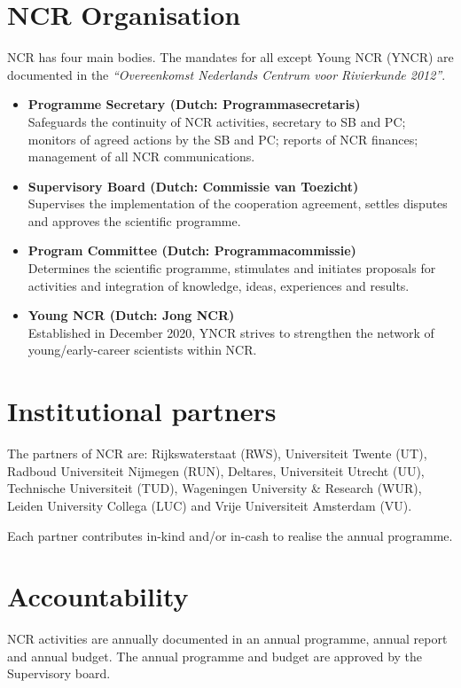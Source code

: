 \begin{multicols}{2}
\section{NCR Organisation}

NCR has four main bodies. The mandates for all except Young NCR (YNCR) are documented in the \emph{“Overeenkomst Nederlands Centrum voor Rivierkunde 2012”}.

\begin{itemize}
\item \textbf{Programme Secretary (Dutch: Programmasecretaris)} \\
Safeguards the continuity of NCR activities, secretary to SB and PC; monitors of agreed actions by the SB and PC; reports of NCR finances; management of all NCR communications.
\item \textbf{Supervisory Board (Dutch: Commissie van Toezicht)}\\ 
Supervises the implementation of the cooperation agreement, settles disputes and approves the scientific programme.
\item \textbf{Program Committee (Dutch: Programmacommissie)} \\
Determines the scientific programme, stimulates and initiates proposals for activities and integration of knowledge, ideas, experiences and results.
\item \textbf{Young NCR (Dutch: Jong NCR)} \\
Established in December 2020, YNCR strives to strengthen the network of young/early-career scientists within NCR. 
\end{itemize}

\section{Institutional partners}
The partners of NCR are: Rijkswaterstaat (RWS), Universiteit Twente (UT), Radboud Universiteit Nijmegen (RUN), Deltares, Universiteit Utrecht (UU), Technische Universiteit (TUD), Wageningen University \& Research (WUR), Leiden University Collega (LUC) and Vrije Universiteit Amsterdam (VU).

Each partner contributes in-kind and/or in-cash to realise the annual programme.  

\section{Accountability}
NCR activities are annually documented in an annual programme, annual report and annual budget. The annual programme and budget are approved by the Supervisory board. 

\end{multicols}

